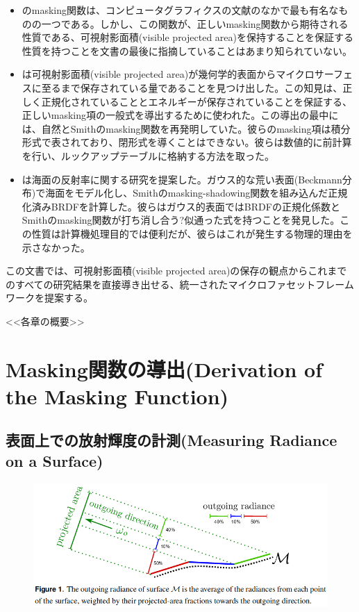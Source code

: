 \documentclass[a4j,xelatex,ja=standard]{bxjsarticle}
\begin{document}
\begin{itemize}
\item \citeauthor{Smith1967} \cite{Smith1967}のmasking関数は、コンピュータグラフィクスの文献のなかで最も有名なものの一つである。しかし、この関数が、正しいmasking関数から期待される性質である、可視射影面積(visible projected area)を保持することを保証する性質を持つことを文書の最後に指摘していることはあまり知られていない。

\item \citeauthor{Ashikmin2000} \cite{Ashikmin2000}は可視射影面積(visible projected area)が幾何学的表面からマイクロサーフェスに至るまで保存されている量であることを見つけ出した。この知見は、正しく正規化されていることとエネルギーが保存されていることを保証する、正しいmasking項の一般式を導出するために使われた。この導出の最中には、自然とSmithのmasking関数を再発明していた。彼らのmasking項は積分形式で表されており、閉形式を導くことはできない。彼らは数値的に前計算を行い、ルックアップテーブルに格納する方法を取った。

\item \citeauthor{Ross2005} \cite{Ross2005}は海面の反射率に関する研究を提案した。ガウス的な荒い表面(Beckmann分布)で海面をモデル化し、Smithのmasking-shadowing関数を組み込んだ正規化済みBRDFを計算した。彼らはガウス的表面ではBRDFの正規化係数とSmithのmasking関数が打ち消し合う?似通った式を持つことを発見した。この性質は計算機処理目的では便利だが、彼らはこれが発生する物理的理由を示さなかった。
\end{itemize}

この文書では、可視射影面積(visible projected area)の保存の観点からこれまでのすべての研究結果を直接導き出せる、統一されたマイクロファセットフレームワークを提案する。

<<各章の概要>>

\section{Masking関数の導出(Derivation of the Masking Function)}

\subsection{表面上での放射輝度の計測(Measuring Radiance on a Surface)}
\label{sec:2.1}

\begin{figure}
    \includegraphics[width=\textwidth]{Figure1.png}
    \caption{}
    \label{fig:1}
\end{figure}
\end{document}
